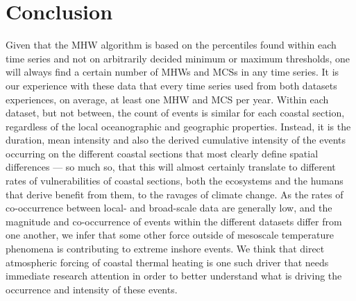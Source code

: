 \documentclass[a4paper,10pt,review]{elsarticle}
\begin{document}
\section{Conclusion} 
Given that the MHW algorithm is based on the percentiles found within each time series and not on arbitrarily decided minimum or maximum thresholds, one will always find a certain number of MHWs and MCSs in any time series. It is our experience with these data that every time series used from both datasets experiences, on average, at least one MHW and MCS per year. Within each dataset, but not between, the count of events is similar for each coastal section, regardless of the local oceanographic and geographic properties. Instead, it is the duration, mean intensity and also the derived cumulative intensity of the events occurring on the different coastal sections that most clearly define spatial differences --- so much so, that this will almost certainly translate to different rates of vulnerabilities of coastal sections, both the ecosystems and the humans that derive benefit from them, to the ravages of climate change. As the rates of co-occurrence between local- and broad-scale data are generally low, and the magnitude and co-occurrence of events within the different datasets differ from one another, we infer that some other force outside of mesoscale temperature phenomena is contributing to extreme inshore events. We think that direct atmospheric forcing of coastal thermal heating is one such driver that needs immediate research attention in order to better understand what is driving the occurrence and intensity of these events.
\end{document}
